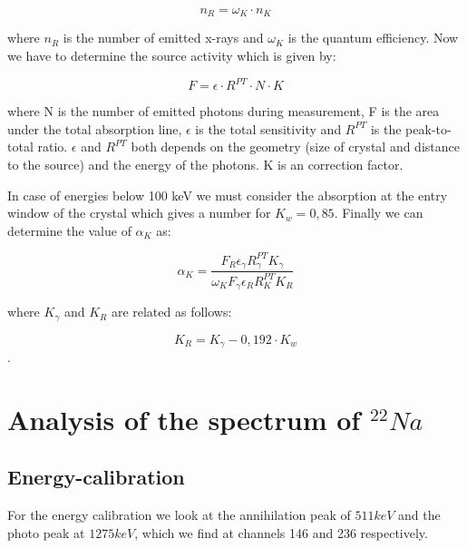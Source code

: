 \documentclass[bigchapter,colorback,accentcolor=tud4b,linedtoc,11pt]{tudreport}
\begin{document}
$$n_R = \omega_K \cdot n_K$$

where $n_R$ is the number of emitted x-rays and $\omega_K$ is the quantum efficiency. Now we have to determine the source activity which is given by:

$$F = \epsilon \cdot R^{PT} \cdot N \cdot K$$

where N is the number of emitted photons during measurement, F is the area under the total absorption line, $\epsilon$ is the total sensitivity and $R^{PT}$ is the peak-to-total ratio. $\epsilon$ and $R^{PT}$ both depends on the geometry (size of crystal and distance to the source) and the energy of the photons. K is an correction factor.

In case of energies below 100 keV we must consider the absorption at the entry window of the crystal which gives a number for $K_w = 0,85$. Finally we can determine the value of $\alpha_K$ as:

$$\alpha_K = \frac{F_R \epsilon_{\gamma} R_{\gamma}^{PT}  K_{\gamma}}{\omega_K F_{\gamma} \epsilon_R R_K^{PT} K_R}$$

where $K_{\gamma}$  and $K_R$ are related as follows: 

$$K_R = K_{\gamma} - 0,192 \cdot K_w$$.

\section{Analysis of the spectrum of $^{22}Na$}
\subsection{Energy-calibration}
\begin{center}
\begin{figure}[H]
\end{figure}
\end{center}
For the energy calibration we look at the annihilation peak of $511 keV$ and the
photo peak at $1275 keV$, which we find at channels 146 and 236 respectively.
\end{document}
